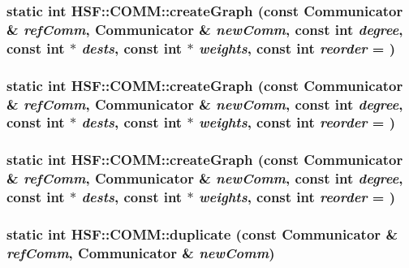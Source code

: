 \label{classHSF_1_1COMM_afcbab02e03ac7f6bce379be298c427de}
\hypertarget{classHSF_1_1COMM_ae7d2271832dcd8690685d8ccbee84615}{
\subsubsection[{createGraph}]{\setlength{\rightskip}{0pt plus 5cm}static int HSF::COMM::createGraph (const {\bf Communicator} \& {\em refComm}, \/  {\bf Communicator} \& {\em newComm}, \/  const int {\em degree}, \/  const int $\ast$ {\em dests}, \/  const int $\ast$ {\em weights}, \/  const int {\em reorder} = {})}}
\label{classHSF_1_1COMM_ae7d2271832dcd8690685d8ccbee84615}
\hypertarget{classHSF_1_1COMM_ae7d2271832dcd8690685d8ccbee84615}{
\subsubsection[{createGraph}]{\setlength{\rightskip}{0pt plus 5cm}static int HSF::COMM::createGraph (const {\bf Communicator} \& {\em refComm}, \/  {\bf Communicator} \& {\em newComm}, \/  const int {\em degree}, \/  const int $\ast$ {\em dests}, \/  const int $\ast$ {\em weights}, \/  const int {\em reorder} = {})}}
\label{classHSF_1_1COMM_ae7d2271832dcd8690685d8ccbee84615}
\hypertarget{classHSF_1_1COMM_ae7d2271832dcd8690685d8ccbee84615}{
\subsubsection[{createGraph}]{\setlength{\rightskip}{0pt plus 5cm}static int HSF::COMM::createGraph (const {\bf Communicator} \& {\em refComm}, \/  {\bf Communicator} \& {\em newComm}, \/  const int {\em degree}, \/  const int $\ast$ {\em dests}, \/  const int $\ast$ {\em weights}, \/  const int {\em reorder} = {})}}
\label{classHSF_1_1COMM_ae7d2271832dcd8690685d8ccbee84615}
\hypertarget{classHSF_1_1COMM_a093162ff2492f8f27d86cb998ff52f10}{
\subsubsection[{duplicate}]{\setlength{\rightskip}{0pt plus 5cm}static int HSF::COMM::duplicate (const {\bf Communicator} \& {\em refComm}, \/  {\bf Communicator} \& {\em newComm})}}
\label{classHSF_1_1COMM_a093162ff2492f8f27d86cb998ff52f10}


